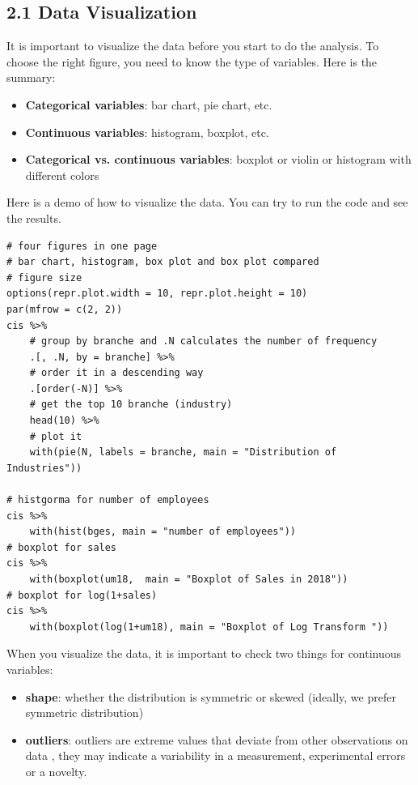 \documentclass[11pt]{article}
\theoremstyle{definition}
\providecommand{\tightlist}{%
\setlength{\itemsep}{0pt}\setlength{\parskip}{0pt}}
\begin{document}
\subsection{2.1 Data Visualization}

It is important to visualize the data before you start to do the analysis.
To choose the right figure, you need to know the type of variables. Here is
the summary:

\begin{itemize}
\tightlist
\item \textbf{Categorical variables}: bar chart, pie chart, etc.
\item \textbf{Continuous variables}: histogram, boxplot, etc.
\item \textbf{Categorical vs. continuous variables}: boxplot or violin or histogram with different colors
\end{itemize}

Here is a demo of how to visualize the data. You can try to run the code
and see the results.

\begin{lstlisting}
# four figures in one page
# bar chart, histogram, box plot and box plot compared
# figure size
options(repr.plot.width = 10, repr.plot.height = 10)
par(mfrow = c(2, 2))
cis %>%
    # group by branche and .N calculates the number of frequency
    .[, .N, by = branche] %>%
    # order it in a descending way
    .[order(-N)] %>%
    # get the top 10 branche (industry)
    head(10) %>%
    # plot it
    with(pie(N, labels = branche, main = "Distribution of Industries"))

# histgorma for number of employees
cis %>%
    with(hist(bges, main = "number of employees"))
# boxplot for sales
cis %>%
    with(boxplot(um18,  main = "Boxplot of Sales in 2018"))
# boxplot for log(1+sales)
cis %>%
    with(boxplot(log(1+um18), main = "Boxplot of Log Transform "))
\end{lstlisting}

When you visualize the data, it is important to check two things for 
continuous variables:
\begin{itemize}
\tightlist
\item \textbf{shape}: whether the distribution is symmetric or skewed (ideally, we prefer symmetric distribution)
\item \textbf{outliers}: outliers are extreme values that deviate from other observations on data , they may indicate a variability in a measurement, experimental errors or a novelty.
\end{itemize}
\end{document}
